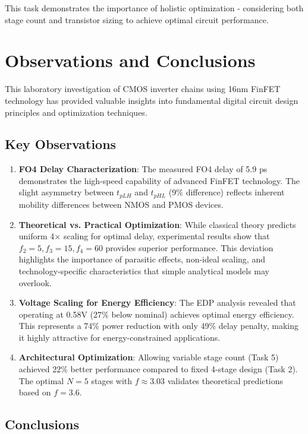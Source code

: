 \documentclass[UTF8,12pt,a4paper]{ctexart}
\begin{document}
This task demonstrates the importance of holistic optimization - considering both stage count and transistor sizing to achieve optimal circuit performance.

\newpage
\section{Observations and Conclusions}

This laboratory investigation of CMOS inverter chains using 16nm FinFET technology has provided valuable insights into fundamental digital circuit design principles and optimization techniques.

\subsection{Key Observations}

\begin{enumerate}
    \item \textbf{FO4 Delay Characterization}: The measured FO4 delay of 5.9 ps demonstrates the high-speed capability of advanced FinFET technology. The slight asymmetry between $t_{pLH}$ and $t_{pHL}$ (9\% difference) reflects inherent mobility differences between NMOS and PMOS devices.

    \item \textbf{Theoretical vs. Practical Optimization}: While classical theory predicts uniform 4× scaling for optimal delay, experimental results show that $f_2=5, f_3=15, f_4=60$ provides superior performance. This deviation highlights the importance of parasitic effects, non-ideal scaling, and technology-specific characteristics that simple analytical models may overlook.
    
    \item \textbf{Voltage Scaling for Energy Efficiency}: The EDP analysis revealed that operating at 0.58V (27\% below nominal) achieves optimal energy efficiency. This represents a 74\% power reduction with only 49\% delay penalty, making it highly attractive for energy-constrained applications.
    
    \item \textbf{Architectural Optimization}: Allowing variable stage count (Task 5) achieved 22\% better performance compared to fixed 4-stage design (Task 2). The optimal $N=5$ stages with $f \approx 3.03$ validates theoretical predictions based on $f = 3.6$.
\end{enumerate}

\subsection{Conclusions}
\end{document}
